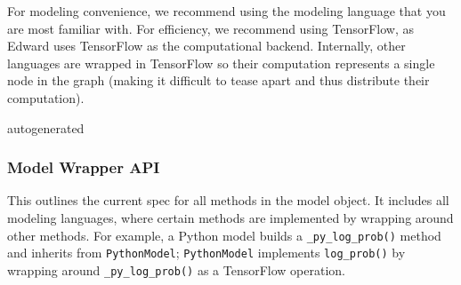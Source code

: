 For modeling convenience, we recommend using the modeling language that
you are most familiar with. For efficiency, we recommend using
TensorFlow, as Edward uses TensorFlow as the computational backend.
Internally, other languages are wrapped in TensorFlow so their
computation represents a single node in the graph (making it difficult
to tease apart and thus distribute their computation).

{{autogenerated}}

\subsubsection{Model Wrapper API}

This outlines the current spec for all methods in the model object.
It includes all modeling languages, where certain methods are
implemented by wrapping around other methods. For example, a Python
model builds a \texttt{_py_log_prob()} method and inherits from
\texttt{PythonModel}; \texttt{PythonModel} implements \texttt{log_prob()} by wrapping
around \texttt{_py_log_prob()} as a TensorFlow operation.

